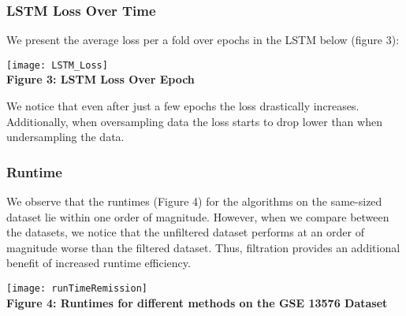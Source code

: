 \documentclass[12pt]{scrartcl}
\begin{document}
    \subsubsection{LSTM Loss Over Time}
    We present the average loss per a fold over epochs in the LSTM below (figure 3):
    
    \begin{center}
    \texttt{[image: LSTM\_Loss]}\\
    \textbf{Figure 3: LSTM Loss Over Epoch}
    \end{center}
    
    We notice that even after just a few epochs the loss drastically increases. Additionally, when oversampling data the loss starts to drop lower than when undersampling the data. 
    
       
    \subsubsection{Runtime}
    We observe that the runtimes (Figure 4) for the algorithms on the same-sized dataset lie within one order of magnitude. However, when we compare between the datasets, we notice that the unfiltered dataset performs at  an order of magnitude worse than the filtered dataset. Thus, filtration provides an additional benefit of increased runtime efficiency.
    
    \begin{center}
    \texttt{[image: runTimeRemission]}\\
    \textbf{Figure 4: Runtimes for different methods on the GSE 13576 Dataset}
    \end{center}
    
    
    
\end{document}
